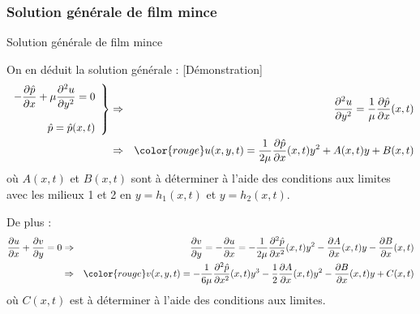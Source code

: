 \subsubsection{Solution générale de film mince}
\begin{frame}{Solution générale de film mince}

\small

On en déduit la solution générale : \hfill \textcolor{gris}{[Démonstration]}
\begin{eqnarray*}
	\left .
	\begin{array}{r}
		-\dpdx{\hat{p}} + \mu \ddpdy{u} = 0
		\\ \\
		\hat{p} = \hat{p}(x, t) 
	\end{array}
	\right \}
	& \Rightarrow & \ddpdy{u} = \dfrac{1}{\mu} \dpdx{\hat{p}}(x, t)
	\\
	& \Rightarrow & 
	\color{rouge}
	u(x, y, t) = \dfrac{1}{2\mu} \dpdx{\hat{p}}(x, t) y^2 + A(x, t) y + B(x, t)
\end{eqnarray*}
où $A(x, t)$ et $B(x, t)$ sont à déterminer à l'aide des conditions aux limites avec les milieux 1 et 2
en $y=h_1(x, t)$ et $y=h_2(x, t)$.

\bigskip
\pause

De plus :
\begin{eqnarray*}
	\dpdx{u} + \dpdy{v} = 0 
	& \Rightarrow &
	\dpdy{v} = - \dpdx{u} = -\dfrac{1}{2\mu} \ddpdx{\hat{p}}(x, t) y^2 - \dpdx{A}(x, t) y - \dpdx{B}(x, t)
	\\
	& \Rightarrow & \color{rouge}
	v(x, y, t) = -\dfrac{1}{6\mu} \ddpdx{\hat{p}}(x, t) y^3 
	             - \dfrac{1}{2}\dpdx{A}(x, t) y^2 - \dpdx{B}(x, t)	y + C(x, t)
\end{eqnarray*}
où $C(x, t)$ est à déterminer à l'aide des conditions aux limites.

\vspace{5mm}

\end{frame}

